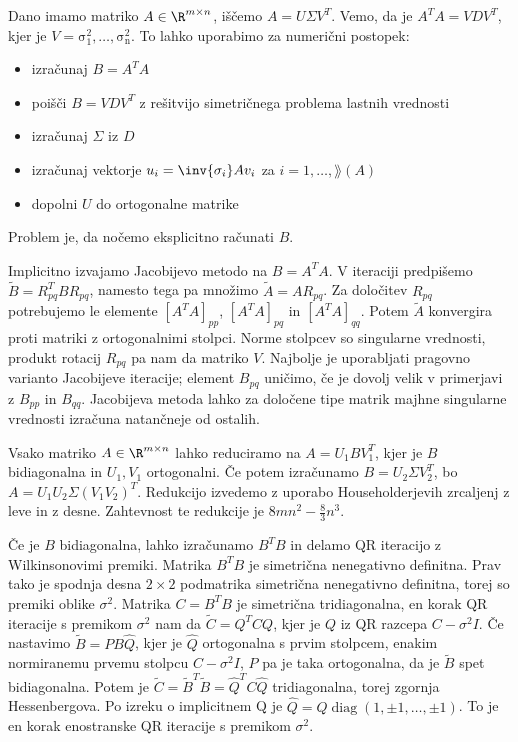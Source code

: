 
Dano imamo matriko $A \in \R^{m \times n}$, iščemo $A = U \Sigma V^T$.
Vemo, da je $A^T A = V D V^T$, kjer je $V = \operatorname{\sigma_1^2, \ldots,
  \sigma_n^2}$.
To lahko uporabimo za numerični postopek:
\begin{itemize}
\item izračunaj $B = A^T A$
\item poišči $B = V D V^T$ z rešitvijo simetričnega problema lastnih vrednosti
\item izračunaj $\Sigma$ iz $D$
\item izračunaj vektorje $u_i = \inv{\sigma_i} A v_i$ za $i = 1, \ldots,
  \rang(A)$
\item dopolni $U$ do ortogonalne matrike
\end{itemize}
Problem je, da nočemo eksplicitno računati $B$.


Implicitno izvajamo Jacobijevo metodo na $B = A^T A$.
V iteraciji predpišemo $\tilde{B} = R_{pq}^T B R_{pq}$, namesto tega pa množimo
$\tilde{A} = A R_{pq}$.
Za določitev $R_{pq}$ potrebujemo le elemente $[A^T A]_{pp}$, $[A^T A]_{pq}$ in
$[A^T A]_{qq}$.
Potem $\tilde{A}$ konvergira proti matriki z ortogonalnimi stolpci.
Norme stolpcev so singularne vrednosti, produkt rotacij $R_{pq}$ pa nam da
matriko $V$.
Najbolje je uporabljati pragovno varianto Jacobijeve iteracije; element $B_{pq}$
uničimo, če je dovolj velik v primerjavi z $B_{pp}$ in $B_{qq}$.
Jacobijeva metoda lahko za določene tipe matrik majhne singularne vrednosti
izračuna natančneje od ostalih.



Vsako matriko $A \in \R^{m \times n}$ lahko reduciramo na $A = U_1 B V_1^T$,
kjer je $B$ bidiagonalna in $U_1, V_1$ ortogonalni.
Če potem izračunamo $B = U_2 \Sigma V_2^T$, bo $A = U_1 U_2 \Sigma (V_1 V_2)^T$.
Redukcijo izvedemo z uporabo Householderjevih zrcaljenj z leve in z desne.
Zahtevnost te redukcije je $8 m n^2 - \frac{8}{3} n^3$.

Če je $B$ bidiagonalna, lahko izračunamo $B^T B$ in delamo QR iteracijo z
Wilkinsonovimi premiki.
Matrika $B^T B$ je simetrična nenegativno definitna.
Prav tako je spodnja desna $2 \times 2$ podmatrika simetrična nenegativno
definitna, torej so premiki oblike $\sigma^2$.
Matrika $C = B^T B$ je simetrična tridiagonalna, en korak QR iteracije s
premikom $\sigma^2$ nam da $\tilde{C} = Q^T C Q$, kjer je $Q$ iz QR razcepa $C -
\sigma^2 I$.
Če nastavimo $\tilde{B} = P B \hat{Q}$, kjer je $\hat{Q}$ ortogonalna s prvim
stolpcem, enakim normiranemu prvemu stolpcu $C - \sigma^2 I$, $P$ pa je taka
ortogonalna, da je $\tilde{B}$ spet bidiagonalna.
Potem je $\tilde{C} = \tilde{B}^T \tilde{B} = \hat{Q}^T C \hat{Q}$
tridiagonalna, torej zgornja Hessenbergova.
Po izreku o implicitnem Q je $\hat{Q} = Q \operatorname{diag}(1, \pm 1, \ldots,
\pm 1)$.
To je en korak enostranske QR iteracije s premikom $\sigma^2$.

